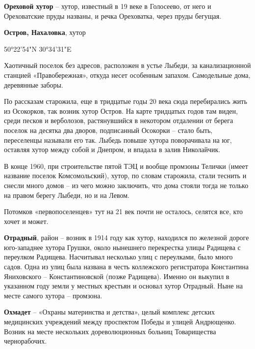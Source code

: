 \textbf{Ореховой хутор} – хутор, известный в 19 веке в Голосеево, от него и Ореховатские пруды названы, и речка Ореховатка, через пруды бегущая.\\

\medskip

\textbf{Остров, Нахаловка}, хутор

50°22'54"N 30°34'31"E

Хаотичный поселок без адресов, расположен в устье Лыбеди, за канализационной станцией «Правобережная», откуда несет особенным запахом. Самодельные дома, деревянные заборы.

По рассказам старожила, еще в тридцатые годы 20 века сюда перебирались жить из Осокорков, так возник хутор Остров. На карте тридцатых годов там виден, среди песков и верболозов, растянувшийся в некотором отдалении от берега поселок на десятка два дворов, подписанный Осокорки – стало быть, переселенцы называли его так. Лыбедь повыше хутора поворачивала на юг, оставляя хутор между собой и Днепром, и впадала в залив Николайчик. 

В конце 1960, при строительстве пятой ТЭЦ и вообще промзоны Телички (имеет название поселок Комсомольский), хутор, по словам старожила, стали теснить и снесли много домов – из чего можно заключить, что дома стояли тогда не только на правом берегу Лыбеди, но и на Левом.

Потомков «первопоселенцев» тут на 21 век почти не осталось, селятся все, кто хочет и может.\\

\medskip


\textbf{Отрадный}, район – возник в 1914 году как хутор, находился по железной дороге юго-запад\-нее хутора Грушки, около нынешнего перекрестка улицы Радищева с переулком Радищева. Насчитывал несколько улиц с переулками, было много садов. Одна из улиц была названа в честь коллежского регистратора Константина Яниховского – Константиновской (позже Радищева). Именно он выкупил в указанном году земли у местных крестьян и основал хутор Отрадный. Ныне на месте самого хутора – промзона.\\


\medskip

\textbf{Охмадет} – «Охраны материнства и детства», целый комплекс детских медицинских учреждений между проспектом Победы и улицей Андрющенко. Возник на месте нескольких дореволюционных больниц Товарищества чернорабочих.\\


